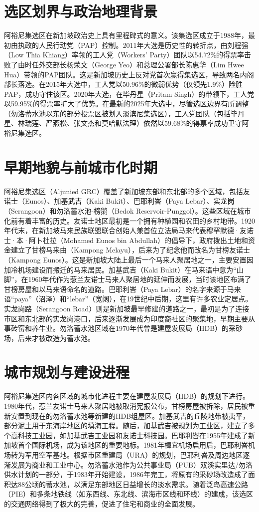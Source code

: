 \documentclass[11pt,a4paper,twoside,openany]{book}
\begin{document}
\section{选区划界与政治地理背景}
阿裕尼集选区在新加坡政治史上具有里程碑式的意义。该集选区成立于1988年，最初由执政的人民行动党（PAP）控制。2011年大选是历史性的转折点，由刘程强（Low Thia Khiang）率领的工人党（Workers' Party）团队以54.72\%的得票率击败了由时任外交部长杨荣文（George Yeo）和总理公署部长陈惠华（Lim Hwee Hua）带领的PAP团队。这是新加坡历史上反对党首次赢得集选区，导致两名内阁部长落选。在2015年大选中，工人党以50.96\%的微弱优势（仅领先1.9\%）险胜PAP，成功守住该区。2020年大选，在毕丹星（Pritam Singh）的带领下，工人党以59.95\%的得票率扩大了优势。在最新的2025年大选中，尽管选区边界有所调整（勿洛蓄水池以东的部分投票区被划入淡滨尼集选区），工人党团队（包括毕丹星、林瑞莲、严燕松、张文杰和莫哈默法理）依然以59.68\%的得票率成功卫守阿裕尼集选区。

\section{早期地貌与前城市化时期}
阿裕尼集选区（Aljunied GRC）覆盖了新加坡东部和东北部的多个区域，包括友诺士（Eunos）、加基武吉（Kaki Bukit）、巴耶利峇（Paya Lebar）、实龙岗（Serangoon）和勿洛蓄水池-榜鹅（Bedok Reservoir-Punggol）。这些区域在城市化前有着丰富的历史。友诺士地区最初是一个拥有种植园和农田的乡村地带。1920年代末，在新加坡马来民族联盟联合创始人兼首位立法局马来代表穆罕默德·友诺士·本·阿卜杜拉（Mohamed Eunos bin Abdullah）的倡导下，政府拨出土地和资金建立了甘榜马来由（Kampong Melayu），后来为了纪念他而改名为甘榜友诺士（Kampong Eunos）。这是新加坡大陆上最后一个马来人聚居地之一，主要安置因加冷机场建设而搬迁的马来居民。加基武吉（Kaki Bukit）在马来语中意为“山脚”，在1960年代作为惹兰友诺士马来人聚居地的延伸而发展，当时该地区布满了甘榜房屋和以马来语命名的道路。巴耶利峇（Paya Lebar）的名字来源于马来语“paya”（沼泽）和“lebar”（宽阔），在19世纪中后期，这里有许多农业定居点。实龙岗路（Serangoon Road）则是新加坡最早修建的道路之一，最初是为了连接市区和东北部的实龙岗港口，后来逐渐发展成为印度裔社区的聚集地，早期主要从事砖窑和养牛业。勿洛蓄水池区域在1970年代曾是建屋发展局（HDB）的采砂场，后来才被改造为蓄水池。

\section{城市规划与建设进程}
阿裕尼集选区内各区域的城市化进程主要在建屋发展局（HDB）的规划下进行。1980年代，惹兰友诺士马来人聚居地被取消宪报公布，甘榜房屋被拆除，居民被重新安置到现在的勿洛蓄水池等新建的HDB组屋区。加基武吉的丘陵地带被夷平，部分泥土用于东海岸地区的填海工程。随后，加基武吉被规划为工业区，建立了多个高科技工业园，如加基武吉工业园和友诺士科技园。巴耶利峇在1955年建成了新加坡首个国际机场，成为该地区的重要地标。1981年樟宜机场启用后，巴耶利峇机场转为军用空军基地。根据市区重建局（URA）的规划，巴耶利峇及周边地区逐渐发展为商业和工业中心。勿洛蓄水池作为公共事业局（PUB）双溪实里达/勿洛供水计划的一部分，于1983年开始建设，1986年完工，将原有的采砂场改造成了面积达88公顷的蓄水池，以满足东部地区日益增长的淡水需求。随着泛岛高速公路（PIE）和多条地铁线（如东西线、东北线、滨海市区线和环线）的建成，该选区的交通网络得到了极大的完善，促进了住宅和商业的全面发展。
\end{document}
